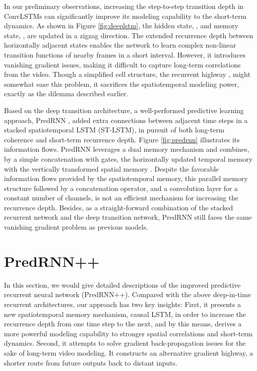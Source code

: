 \documentclass{article}
\begin{document}
In our preliminary observations, increasing the step-to-step transition depth in ConvLSTMs can significantly improve its modeling capability to the short-term dynamics. As shown in Figure \ref{fig:deeplstm}, the hidden state, , and memory state, , are updated in a zigzag direction. The extended recurrence depth between horizontally adjacent states enables the network to learn complex non-linear transition functions of nearby frames in a short interval. However, it introduces vanishing gradient issues, making it difficult to capture long-term correlations from the video. Though a simplified cell structure, the recurrent highway \cite{zilly2016recurrent}, might somewhat ease this problem, it sacrifices the spatiotemporal modeling power, exactly as the dilemma described earlier.





Based on the deep transition architecture, a well-performed predictive learning approach, PredRNN \cite{wang2017predrnn}, added extra connections between adjacent time steps in a stacked spatiotemporal LSTM (ST-LSTM), in pursuit of both long-term coherence and short-term recurrence depth. Figure \ref{fig:predrnn} illustrates its information flows. PredRNN leverages a dual memory mechanism and combines, by a simple concatenation with gates, the horizontally updated temporal memory  with the vertically transformed spatial memory . Despite the favorable information flows provided by the spatiotemporal memory, this parallel memory structure followed by a concatenation operator, and a  convolution layer for a constant number of channels, is not an efficient mechanism for increasing the recurrence depth. Besides, as a straight-forward combination of the stacked recurrent network and the deep transition network, PredRNN still faces the same vanishing gradient problem as previous models.










\section{PredRNN++}
In this section, we would give detailed descriptions of the improved predictive recurrent neural network (PredRNN++). Compared with the above deep-in-time recurrent architectures, our approach has two key insights: First, it presents a new spatiotemporal memory mechanism, causal LSTM, in order to increase the recurrence depth from one time step to the next, and by this means, derives a more powerful modeling capability to stronger spatial correlations and short-term dynamics. Second, it attempts to solve gradient back-propagation issues for the sake of long-term video modeling. It constructs an alternative gradient highway, a shorter route from future outputs back to distant inputs. 
\end{document}
